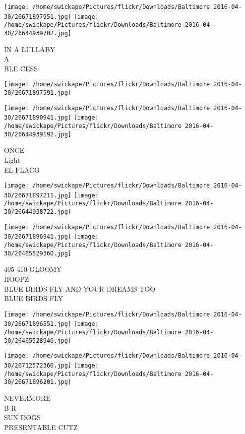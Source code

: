 \documentclass[10pt,letterpaper]{article}
\begin{document}
\vspace{0.25in}
\texttt{[image: /home/swickape/Pictures/flickr/Downloads/Baltimore 2016-04-30/26671897951.jpg]}
\texttt{[image: /home/swickape/Pictures/flickr/Downloads/Baltimore 2016-04-30/26644939702.jpg]}

IN A LULLABY\\
A\\
BLE CESS\\
\pagebreak

\texttt{[image: /home/swickape/Pictures/flickr/Downloads/Baltimore 2016-04-30/26671897591.jpg]}

\vspace{0.25in}
\texttt{[image: /home/swickape/Pictures/flickr/Downloads/Baltimore 2016-04-30/26671890941.jpg]}
\texttt{[image: /home/swickape/Pictures/flickr/Downloads/Baltimore 2016-04-30/26644939192.jpg]}

ONCE\\
Light\\
EL FLACO\\
\pagebreak

\texttt{[image: /home/swickape/Pictures/flickr/Downloads/Baltimore 2016-04-30/26671897211.jpg]}
\texttt{[image: /home/swickape/Pictures/flickr/Downloads/Baltimore 2016-04-30/26644938722.jpg]}

\texttt{[image: /home/swickape/Pictures/flickr/Downloads/Baltimore 2016-04-30/26671896941.jpg]}
\texttt{[image: /home/swickape/Pictures/flickr/Downloads/Baltimore 2016-04-30/26465529360.jpg]}

405{-}410 GLOOMY\\
HOOPZ\\
BLUE BIRDS FLY AND YOUR DREAMS TOO\\
BLUE BIRDS FLY\\
\pagebreak

\texttt{[image: /home/swickape/Pictures/flickr/Downloads/Baltimore 2016-04-30/26671896551.jpg]}
\texttt{[image: /home/swickape/Pictures/flickr/Downloads/Baltimore 2016-04-30/26465528940.jpg]}

\texttt{[image: /home/swickape/Pictures/flickr/Downloads/Baltimore 2016-04-30/26712572366.jpg]}
\texttt{[image: /home/swickape/Pictures/flickr/Downloads/Baltimore 2016-04-30/26671896201.jpg]}

NEVERMORE\\
B R\\
SUN DOGS\\
PRESENTABLE CUTZ\\
\pagebreak
\end{document}
